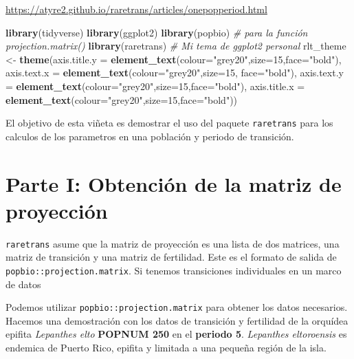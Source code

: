 \documentclass[
]{book}
\newenvironment{Shaded}{\begin{snugshade}}{\end{snugshade}}
\newcommand{\AttributeTok}[1]{\textcolor[rgb]{0.13,0.29,0.53}{#1}}
\newcommand{\CommentTok}[1]{\textcolor[rgb]{0.56,0.35,0.01}{\textit{#1}}}
\newcommand{\DecValTok}[1]{\textcolor[rgb]{0.00,0.00,0.81}{#1}}
\newcommand{\FunctionTok}[1]{\textcolor[rgb]{0.13,0.29,0.53}{\textbf{#1}}}
\newcommand{\NormalTok}[1]{#1}
\newcommand{\OtherTok}[1]{\textcolor[rgb]{0.56,0.35,0.01}{#1}}
\newcommand{\StringTok}[1]{\textcolor[rgb]{0.31,0.60,0.02}{#1}}
\theoremstyle{definition}
\theoremstyle{definition}
\theoremstyle{definition}
\theoremstyle{definition}
\theoremstyle{remark}
\begin{document}
\url{https://atyre2.github.io/raretrans/articles/onepopperiod.html}

\begin{Shaded}
\begin{Highlighting}[]
\FunctionTok{library}\NormalTok{(tidyverse)}
\FunctionTok{library}\NormalTok{(ggplot2)}
\FunctionTok{library}\NormalTok{(popbio) }\CommentTok{\# para la función projection.matrix()}
\FunctionTok{library}\NormalTok{(raretrans)}
\CommentTok{\# Mi tema de ggplot2 personal}
\NormalTok{rlt\_theme }\OtherTok{\textless{}{-}} \FunctionTok{theme}\NormalTok{(}\AttributeTok{axis.title.y =} \FunctionTok{element\_text}\NormalTok{(}\AttributeTok{colour=}\StringTok{"grey20"}\NormalTok{,}\AttributeTok{size=}\DecValTok{15}\NormalTok{,}\AttributeTok{face=}\StringTok{"bold"}\NormalTok{),}
        \AttributeTok{axis.text.x =} \FunctionTok{element\_text}\NormalTok{(}\AttributeTok{colour=}\StringTok{"grey20"}\NormalTok{,}\AttributeTok{size=}\DecValTok{15}\NormalTok{, }\AttributeTok{face=}\StringTok{"bold"}\NormalTok{),}
        \AttributeTok{axis.text.y =} \FunctionTok{element\_text}\NormalTok{(}\AttributeTok{colour=}\StringTok{"grey20"}\NormalTok{,}\AttributeTok{size=}\DecValTok{15}\NormalTok{,}\AttributeTok{face=}\StringTok{"bold"}\NormalTok{),  }
        \AttributeTok{axis.title.x =} \FunctionTok{element\_text}\NormalTok{(}\AttributeTok{colour=}\StringTok{"grey20"}\NormalTok{,}\AttributeTok{size=}\DecValTok{15}\NormalTok{,}\AttributeTok{face=}\StringTok{"bold"}\NormalTok{))}
\end{Highlighting}
\end{Shaded}

El objetivo de esta viñeta es demostrar el uso del paquete \texttt{raretrans}
para los calculos de los parametros en una población y periodo de
transición.

\section{Parte I: Obtención de la matriz de proyección}\label{parte-i-obtenciuxf3n-de-la-matriz-de-proyecciuxf3n}

\texttt{raretrans} asume que la matriz de proyección es una lista de dos
matrices, una matriz de transición y una matriz de fertilidad. Este es
el formato de salida de \texttt{popbio::projection.matrix}. Si tenemos
transiciones individuales en un marco de datos

Podemos utilizar \texttt{popbio::projection.matrix} para obtener los datos
necesarios. Hacemos una demostración con los datos de transición y
fertilidad de la orquídea epifita \emph{Lepanthes elto} \textbf{POPNUM 250} en el
\textbf{periodo 5}. \emph{Lepanthes eltoroensis} es endemica de Puerto Rico, epifita y limitada a una pequeña región de la isla.
\end{document}
